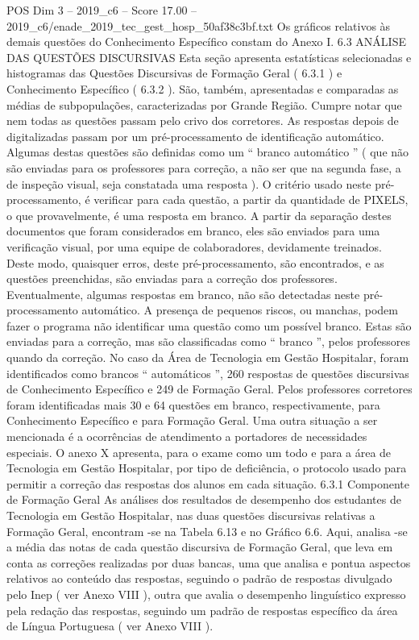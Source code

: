 \begin{textsample}{POS Dim 3 – 2019\_c6 – Score 17.00 – 2019\_c6/enade\_2019\_tec\_gest\_hosp\_50af38c3bf.txt}
Os gráficos relativos às demais questões do Conhecimento Específico constam do Anexo I. 6.3 ANÁLISE DAS QUESTÕES DISCURSIVAS Esta seção apresenta estatísticas selecionadas e histogramas das Questões Discursivas de Formação Geral ( 6.3.1 ) e Conhecimento Específico ( 6.3.2 ).
São, também, apresentadas e comparadas as médias de subpopulações, caracterizadas por Grande Região.
Cumpre notar que nem todas as questões passam pelo crivo dos corretores.
As respostas depois de digitalizadas passam por um pré-processamento de identificação automático.
Algumas destas questões são definidas como um “ branco automático ” ( que não são enviadas para os professores para correção, a não ser que na segunda fase, a de inspeção visual, seja constatada uma resposta ).
O critério usado neste pré-processamento, é verificar para cada questão, a partir da quantidade de PIXELS, o que provavelmente, é uma resposta em branco.
A partir da separação destes documentos que foram considerados em branco, eles são enviados para uma verificação visual, por uma equipe de colaboradores, devidamente treinados.
Deste modo, quaisquer erros, deste pré-processamento, são encontrados, e as questões preenchidas, são enviadas para a correção dos professores.
Eventualmente, algumas respostas em branco, não são detectadas neste pré-processamento automático.
A presença de pequenos riscos, ou manchas, podem fazer o programa não identificar uma questão como um possível branco.
Estas são enviadas para a correção, mas são classificadas como “ branco ”, pelos professores quando da correção.
No caso da Área de Tecnologia em Gestão Hospitalar, foram identificados como brancos “ automáticos ”, 260 respostas de questões discursivas de Conhecimento Específico e 249 de Formação Geral.
Pelos professores corretores foram identificadas mais 30 e 64 questões em branco, respectivamente, para Conhecimento Específico e para Formação Geral.
Uma outra situação a ser mencionada é a ocorrências de atendimento a portadores de necessidades especiais.
O anexo X apresenta, para o exame como um todo e para a área de Tecnologia em Gestão Hospitalar, por tipo de deficiência, o protocolo usado para permitir a correção das respostas dos alunos em cada situação. 6.3.1 Componente de Formação Geral As análises dos resultados de desempenho dos estudantes de Tecnologia em Gestão Hospitalar, nas duas questões discursivas relativas a Formação Geral, encontram -se na Tabela 6.13 e no Gráfico 6.6.
Aqui, analisa -se a média das notas de cada questão discursiva de Formação Geral, que leva em conta as correções realizadas por duas bancas, uma que analisa e pontua aspectos relativos ao conteúdo das respostas, seguindo o padrão de respostas divulgado pelo Inep ( ver Anexo VIII ), outra que avalia o desempenho linguístico expresso pela redação das respostas, seguindo um padrão de respostas específico da área de Língua Portuguesa ( ver Anexo VIII ).

\end{textsample}
